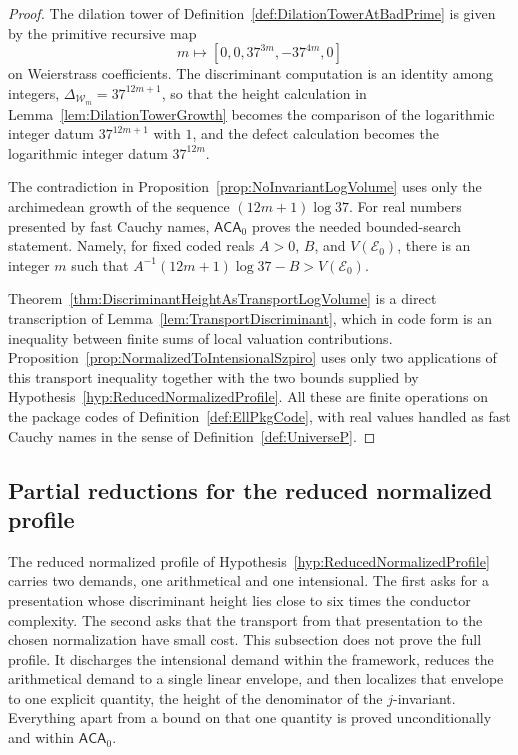 \documentclass[10pt, reqno]{amsart}
\theoremstyle{plain}
\theoremstyle{definition}
\theoremstyle{plain}
\begin{document}
\begin{proof}
The dilation tower of Definition~\ref{def:DilationTowerAtBadPrime} is given by the primitive recursive map
\[
  m
  \longmapsto
  [0,0,37^{3m},-37^{4m},0]
\]
on Weierstrass coefficients. The discriminant computation is an identity among integers, $\Delta_{\mathcal{W}_m}=37^{12m+1}$, so that the height calculation in Lemma~\ref{lem:DilationTowerGrowth} becomes the comparison of the logarithmic integer datum $37^{12m+1}$ with $1$, and the defect calculation becomes the logarithmic integer datum $37^{12m}$.

The contradiction in Proposition~\ref{prop:NoInvariantLogVolume} uses only the archimedean growth of the sequence $(12m+1)\log 37$. For real numbers presented by fast Cauchy names, $\mathsf{ACA}_0$ proves the needed bounded-search statement. Namely, for fixed coded reals $A>0$, $B$, and $V(\mathcal{E}_0)$, there is an integer $m$ such that $A^{-1}(12m+1)\log 37-B>V(\mathcal{E}_0)$.

Theorem~\ref{thm:DiscriminantHeightAsTransportLogVolume} is a direct transcription of Lemma~\ref{lem:TransportDiscriminant}, which in code form is an inequality between finite sums of local valuation contributions. Proposition~\ref{prop:NormalizedToIntensionalSzpiro} uses only two applications of this transport inequality together with the two bounds supplied by Hypothesis~\ref{hyp:ReducedNormalizedProfile}. All these are finite operations on the package codes of Definition~\ref{def:EllPkgCode}, with real values handled as fast Cauchy names in the sense of Definition~\ref{def:UniverseP}.
\end{proof}

\subsection{Partial reductions for the reduced normalized profile}
\label{subsec:PartialReducedNormalizedProfile}

The reduced normalized profile of Hypothesis~\ref{hyp:ReducedNormalizedProfile} carries two demands, one arithmetical and one intensional. The first asks for a presentation whose discriminant height lies close to six times the conductor complexity. The second asks that the transport from that presentation to the chosen normalization have small cost. This subsection does not prove the full profile. It discharges the intensional demand within the framework, reduces the arithmetical demand to a single linear envelope, and then localizes that envelope to one explicit quantity, the height of the denominator of the $j$-invariant. Everything apart from a bound on that one quantity is proved unconditionally and within $\mathsf{ACA}_{0}$.
\end{document}
